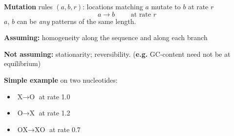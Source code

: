 \documentclass[fontscale=0.38]{baposter}
\begin{document}
\begin{poster}
{  \textbf{Mutation} rules $(a,b,r)$: 
    locations matching $a$ mutate to $b$ at rate $r$ 
  \[
  a \longrightarrow b \qquad \text{ at rate } r
  \]
  $a$, $b$ can be \emph{any} patterns of the same length.

% 


    \vspace{1em}

\textbf{Assuming:}
    homogeneity along the sequence and along each branch

    \textbf{Not assuming:}
    stationarity;
    reversibility.
    (\textbf{e.g.} GC-content need not be at equilibrium)


    \vspace{1em}

  \parbox[b]{.4\textwidth}{

    \textbf{Simple example} on two nucleotides:
      \begin{itemize}
        \item $\text{X} \to \text{O}$ at rate 1.0
        \item $\text{O} \to \text{X}$ at rate 1.2
        \item $\text{OX} \to \text{XO}$ at rate 0.7
      \end{itemize}

  }\parbox[b]{.3\textwidth}{

}}
\end{poster}
\end{document}
